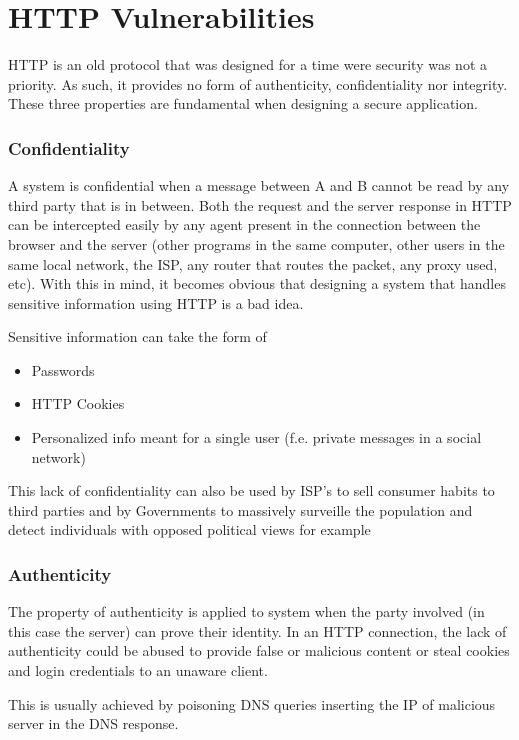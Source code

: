 \section{HTTP Vulnerabilities}
HTTP is an old protocol that was designed for a time were security was not a priority. As such, it provides no form of authenticity, confidentiality nor integrity. These three properties are fundamental when designing a secure application.	

\subsubsection{Confidentiality}
A system is confidential when a message between A and B cannot be read by any third party that is in between. Both the request and the server response in HTTP can be intercepted easily by any agent present in the connection between the browser and the server (other programs in the same computer, other users in the same local network, the ISP, any router that routes the packet, any proxy used, etc). With this in mind, it becomes obvious that designing a system that handles sensitive information using HTTP is a bad idea.

Sensitive information can take the form of
\begin{itemize}
	\item Passwords
	\item HTTP Cookies
	\item Personalized info meant for a single user (f.e. private messages in a social network)
\end{itemize}

This lack of confidentiality can also be used by ISP's to sell consumer habits to third parties and by Governments to massively surveille the population and detect individuals with opposed political views for example

\subsubsection{Authenticity}
The property of authenticity is applied to system when the party involved (in this case the server) can prove their identity. In an HTTP connection, the lack of authenticity could be abused to provide false or malicious content or steal cookies and login credentials to an unaware client. 

This is usually achieved by poisoning DNS queries inserting the IP of malicious server in the DNS response.

